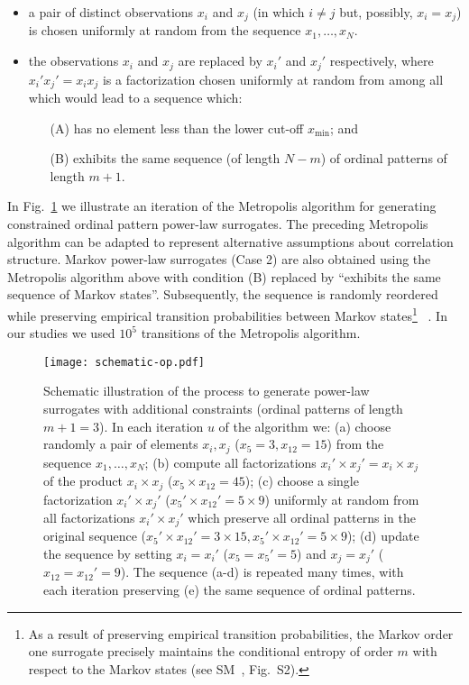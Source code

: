 \documentclass[%
prx,
reprint,
superscriptaddress,
nofootinbib,
 amsmath,amssymb,
 aps,
floatfix,
]{revtex4-2}
\begin{document}
%
\begin{itemize}
    \item a pair of distinct observations $x_i$ and $x_j$ (in which $i \neq j$ but, possibly, $x_i = x_j$) is chosen uniformly at random from the sequence $x_1, \ldots, x_N$. 
%
    \item the observations $x_i$ and $x_j$ are replaced by $x_i'$ and $x_j'$ respectively, where $x_i' x_j' = x_i x_j$ is a factorization chosen uniformly at random from among all which would lead to a sequence which: 
    \begin{itemize}
        \item[(A)] has no element less than the lower cut-off $x_{\min}$; and 
        \item[(B)] exhibits the same sequence (of {length} $N - m$) of ordinal patterns of length $m + 1$. 
    \end{itemize}
\end{itemize}
%
In Fig.~\ref{fig:schematic-op} we illustrate an iteration of the Metropolis algorithm for generating constrained ordinal pattern power-law surrogates.
%
The preceding Metropolis algorithm can be adapted to represent alternative assumptions about correlation structure. 
%
Markov power-law surrogates (Case 2) are also obtained using the Metropolis algorithm above with condition (B) replaced by ``exhibits the same sequence %
of Markov states''. 
Subsequently, the sequence is randomly reordered while preserving empirical transition probabilities between Markov states\footnote{As a result of preserving empirical transition probabilities, the Markov order one surrogate precisely maintains the conditional entropy of order $m$ with respect to the Markov states (see SM~\cite{supplemental}, {Fig.~S2}).}%
~\cite{kandel1996shuffling, van1998testing, pethel2014exact, correa2020constrained}.
In our studies we used $10^5$ transitions of the Metropolis algorithm.

\begin{figure}[htbp]
\texttt{[image: schematic-op.pdf]}
\caption{Schematic illustration of the process to generate power-law surrogates with additional constraints (ordinal patterns of length $m+1=3$). 
In each iteration $u$ of the algorithm we: (a) choose randomly a pair of elements $x_i,x_j$ ($x_5 = 3,x_{12} = 15$) from the sequence $x_1, \ldots, x_N$; (b) compute all factorizations $x_i'\times  x_j' = x_i \times x_j$ of the product $x_i \times x_j$ ($x_5 \times x_{12} = 45$); (c) choose a single factorization $x_i' \times x_j'$ ($x_5'\times x_{12}' = 5 \times 9$) uniformly at random from all factorizations $x_i'\times x_j'$ which preserve all ordinal patterns in the original sequence ($x_5'\times x_{12}' = 3\times 15, x_5'\times x_{12}' = 5\times 9$); (d) update the sequence by setting $x_i = x_i'$ ($x_5 = x_5' = 5$) and $x_j = x_j'$ ($x_{12} = x_{12}' = 9$). The sequence (a-d) is repeated many times, with each iteration preserving (e) the same sequence of ordinal patterns. }
\label{fig:schematic-op}
\end{figure}
\end{document}
